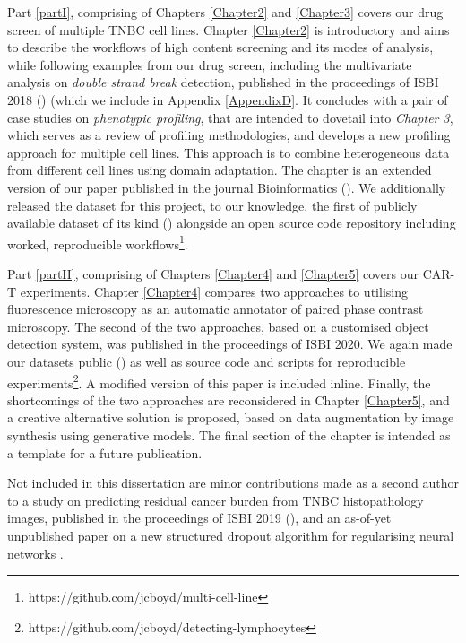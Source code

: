Part \ref{partI}, comprising of Chapters \ref{Chapter2} and \ref{Chapter3} covers our drug screen of multiple TNBC cell lines. Chapter \ref{Chapter2} is introductory and aims to describe the workflows of high content screening and its modes of analysis, while following examples from our drug screen, including the multivariate analysis on \emph{double strand break} detection, published in the proceedings of ISBI 2018 (\cite{boyd2018analysing}) (which we include in Appendix \ref{AppendixD}. It concludes with a pair of case studies on \emph{phenotypic profiling}, that are intended to dovetail into \emph{Chapter 3}, which serves as a review of profiling methodologies, and develops a new profiling approach for multiple cell lines. This approach is to combine heterogeneous data from different cell lines using domain adaptation. The chapter is an extended version of our paper published in the journal Bioinformatics (\cite{boyd2020domain}). We additionally released the dataset for this project, to our knowledge, the first of publicly available dataset of its kind (\cite{Boyd_Reyal_Pinheiro_Del_Nery_Walter_2019}) alongside an open source code repository including worked, reproducible workflows\footnote{https://github.com/jcboyd/multi-cell-line}.

Part \ref{partII}, comprising of Chapters \ref{Chapter4} and \ref{Chapter5} covers our CAR-T experiments. Chapter \ref{Chapter4} compares two approaches to utilising fluorescence microscopy as an automatic annotator of paired phase contrast microscopy. The second of the two approaches, based on a customised object detection system, was published in the proceedings of ISBI 2020. We again made our datasets public (\cite{Boyd_Gouveia_Perez_Walter_2019}) as well as source code and scripts for reproducible experiments\footnote{https://github.com/jcboyd/detecting-lymphocytes}.  A modified version of this paper is included inline. Finally, the shortcomings of the two approaches are reconsidered in Chapter \ref{Chapter5}, and a creative alternative solution is proposed, based on data augmentation by image synthesis using generative models. The final section of the chapter is intended as a template for a future publication. 

Not included in this dissertation are minor contributions made as a second author to a study on predicting residual cancer burden from TNBC histopathology images, published in the proceedings of ISBI 2019 (\cite{naylor2019predicting}), and an as-of-yet unpublished paper on a new structured dropout algorithm for regularising neural networks \cite{khalfaoui2019adaptive}.

